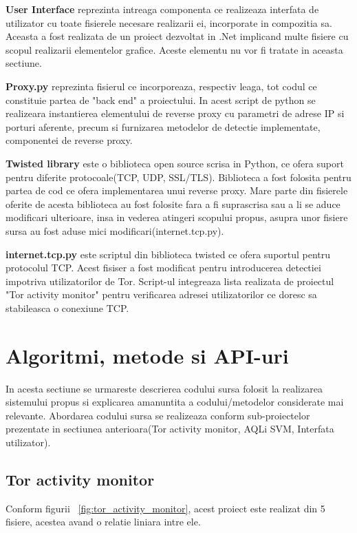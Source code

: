 \textbf{User Interface} reprezinta intreaga componenta ce realizeaza interfata de utilizator cu toate fisierele necesare realizarii ei, incorporate in compozitia sa. Aceasta a fost realizata de un proiect dezvoltat in .Net implicand multe fisiere cu scopul realizarii elementelor grafice. Aceste elementu nu vor fi tratate in aceasta sectiune.

\textbf{Proxy.py} reprezinta fisierul ce incorporeaza, respectiv leaga, tot codul ce constituie partea de "back end" a proiectului. In acest script de python se realizeara instantierea elementului de reverse proxy cu parametri de adrese IP si porturi aferente, precum si furnizarea metodelor de detectie implementate, componentei de reverse proxy.

\textbf{Twisted library} este o biblioteca open source scrisa in Python, ce ofera suport pentru diferite protocoale(TCP, UDP, SSL/TLS). Biblioteca a fost folosita pentru partea de cod ce ofera implementarea unui reverse proxy. Mare parte din fisierele oferite de acesta biblioteca au fost folosite fara a fi suprascrisa sau a li se aduce modificari ulterioare, insa in vederea atingeri scopului propus, asupra unor fisiere sursa au fost aduse mici modificari(internet.tcp.py).

\textbf{internet.tcp.py} este scriptul din biblioteca twisted ce ofera suportul pentru protocolul TCP. Acest fisiser a fost modificat pentru introducerea detectiei impotriva utilizatorilor de Tor. Script-ul integreaza lista realizata de proiectul "Tor activity monitor" pentru verificarea adresei utilizatorilor ce doresc sa stabileasca o conexiune TCP.




\section{Algoritmi, metode si API-uri}

In acesta sectiune se urmareste descrierea codului sursa folosit la realizarea sistemului propus si explicarea amanuntita a codului/metodelor considerate mai relevante. Abordarea codului sursa se realizeaza conform sub-proiectelor prezentate in sectiunea anterioara(Tor activity monitor, AQLi SVM, Interfata utilizator).

\subsection{Tor activity monitor}

Conform figurii ~\ref{fig:tor_activity_monitor}, acest proiect este realizat din 5 fisiere, acestea avand o relatie liniara intre ele.

